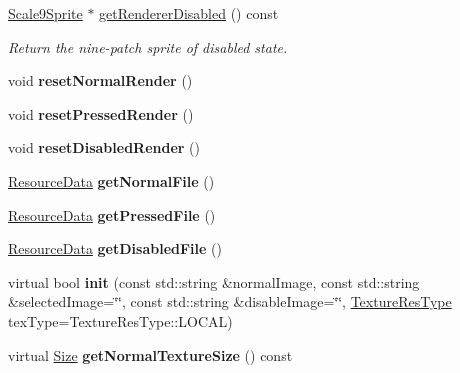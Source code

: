 \begin{DoxyCompactItemize}
\hyperlink{classui_1_1Scale9Sprite}{Scale9\+Sprite} $\ast$ \hyperlink{classui_1_1Button_acbc88b0f82871718e0f49bda5e4cf0ca}{get\+Renderer\+Disabled} () const
\begin{DoxyCompactList}\small\item\em Return the nine-\/patch sprite of disabled state. \end{DoxyCompactList}\item 
\mbox{\label{classui_1_1Button_a1a89c58c89ef432937af06c395e616d4}} 
void {\bfseries reset\+Normal\+Render} ()
\item 
\mbox{\label{classui_1_1Button_abb76b3d69d29c6cf8d8b7342bb221ba8}} 
void {\bfseries reset\+Pressed\+Render} ()
\item 
\mbox{\label{classui_1_1Button_af1ebb4b0a006d9b28bb7b136fdc98119}} 
void {\bfseries reset\+Disabled\+Render} ()
\item 
\mbox{\label{classui_1_1Button_aa2671cdb5df1f64425ff9bc26a4fda46}} 
\hyperlink{structResourceData}{Resource\+Data} {\bfseries get\+Normal\+File} ()
\item 
\mbox{\label{classui_1_1Button_a4c7452048a28db740a6b9c70fa6a51f3}} 
\hyperlink{structResourceData}{Resource\+Data} {\bfseries get\+Pressed\+File} ()
\item 
\mbox{\label{classui_1_1Button_a6bcd8541d3763efbe14c2394a390c1ee}} 
\hyperlink{structResourceData}{Resource\+Data} {\bfseries get\+Disabled\+File} ()
\item 
\mbox{\label{classui_1_1Button_abce28d44f74bec535ce00f021dd7fb7d}} 
virtual bool {\bfseries init} (const std\+::string \&normal\+Image, const std\+::string \&selected\+Image=\char`\"{}\char`\"{}, const std\+::string \&disable\+Image=\char`\"{}\char`\"{}, \hyperlink{classui_1_1Widget_a040a65ec5ad3b11119b7e16b98bd9af0}{Texture\+Res\+Type} tex\+Type=Texture\+Res\+Type\+::\+L\+O\+C\+AL)
\item 
\mbox{\label{classui_1_1Button_aa3bfb41b05b792cecfa9baf95adea32e}} 
virtual \hyperlink{classSize}{Size} {\bfseries get\+Normal\+Texture\+Size} () const
\end{DoxyCompactItemize}
